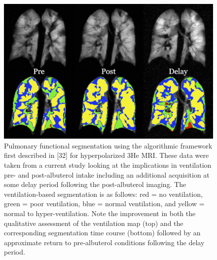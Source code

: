 \documentclass[11pt,]{article}
\begin{document}
\begin{figure}[htbp]
\centering
\includegraphics{Figs/prePostAlbuterol.png}
\caption{Pulmonary functional segmentation using the algorithmic
framework first described in {[}32{]} for hyperpolarized 3He MRI. These
data were taken from a current study looking at the implications in
ventilation pre- and post-albuterol intake including an additional
acquisition at some delay period following the post-albuterol imaging.
The ventilation-based segmentation is as follows: red = no ventilation,
green = poor ventilation, blue = normal ventilation, and yellow = normal
to hyper-ventilation. Note the improvement in both the qualitative
assessment of the ventilation map (top) and the corresponding
segmentation time course (bottom) followed by an approximate return to
pre-albuterol conditions following the delay period.}
\end{figure}
\end{document}
